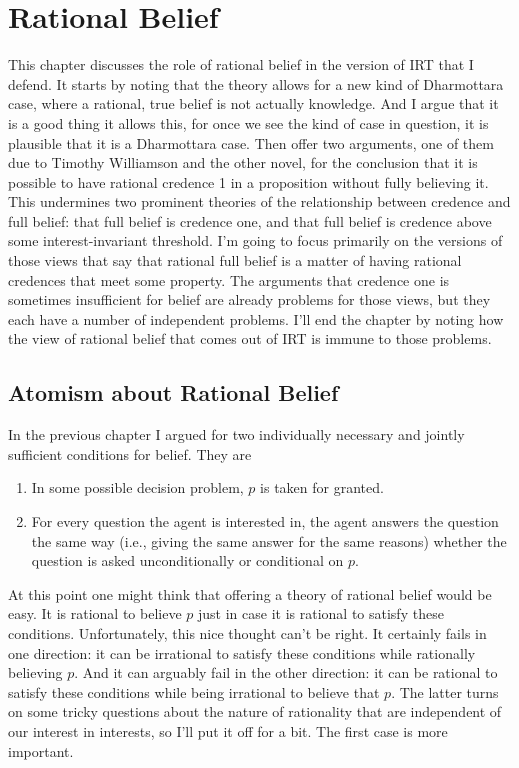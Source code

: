 \documentclass[11pt,]{book}
\providecommand{\tightlist}{%
  \setlength{\itemsep}{0pt}\setlength{\parskip}{0pt}}
\begin{document}
\hypertarget{ratbel}{%
\chapter{Rational Belief}\label{ratbel}}

This chapter discusses the role of rational belief in the version of IRT that I defend. It starts by noting that the theory allows for a new kind of Dharmottara case, where a rational, true belief is not actually knowledge. And I argue that it is a good thing it allows this, for once we see the kind of case in question, it is plausible that it is a Dharmottara case. Then offer two arguments, one of them due to Timothy Williamson and the other novel, for the conclusion that it is possible to have rational credence 1 in a proposition without fully believing it. This undermines two prominent theories of the relationship between credence and full belief: that full belief is credence one, and that full belief is credence above some interest-invariant threshold. I'm going to focus primarily on the versions of those views that say that rational full belief is a matter of having rational credences that meet some property. The arguments that credence one is sometimes insufficient for belief are already problems for those views, but they each have a number of independent problems. I'll end the chapter by noting how the view of rational belief that comes out of IRT is immune to those problems.

\hypertarget{atomism-about-rational-belief}{%
\section{Atomism about Rational Belief}\label{atomism-about-rational-belief}}

In the previous chapter I argued for two individually necessary and jointly sufficient conditions for belief. They are

\begin{enumerate}
\def\labelenumi{\arabic{enumi}.}
\tightlist
\item
  In some possible decision problem, \(p\) is taken for granted.
\item
  For every question the agent is interested in, the agent answers the question the same way (i.e., giving the same answer for the same reasons) whether the question is asked unconditionally or conditional on \(p\).
\end{enumerate}

At this point one might think that offering a theory of rational belief would be easy. It is rational to believe \(p\) just in case it is rational to satisfy these conditions. Unfortunately, this nice thought can't be right. It certainly fails in one direction: it can be irrational to satisfy these conditions while rationally believing \(p\). And it can arguably fail in the other direction: it can be rational to satisfy these conditions while being irrational to believe that \(p\). The latter turns on some tricky questions about the nature of rationality that are independent of our interest in interests, so I'll put it off for a bit. The first case is more important.
\end{document}
